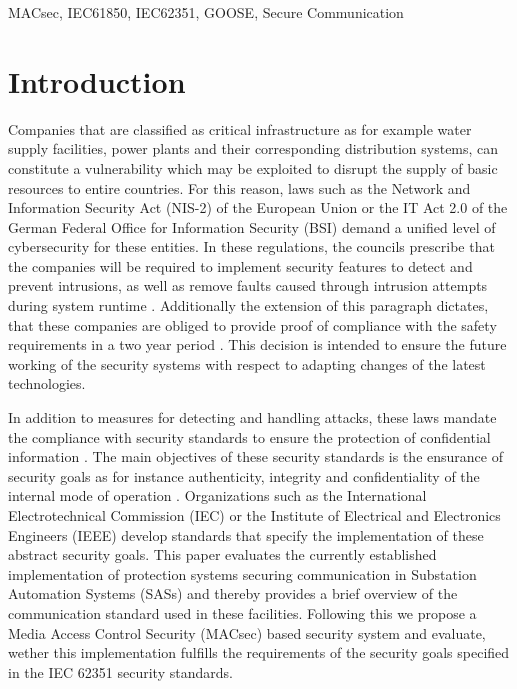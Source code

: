 \documentclass[conference, onecolumn, a4paper]{IEEEtran}
\begin{document}
\vspace{6 pt}

\begin{IEEEkeywords}
    MACsec, IEC61850, IEC62351, GOOSE, Secure Communication
\end{IEEEkeywords}

\section{Introduction}
\label{chapter:introduction}
\noindent Companies that are classified as critical infrastructure as for example water supply facilities, power plants and their corresponding 
distribution systems, can constitute a vulnerability which may be exploited to disrupt the supply of basic resources to entire countries. For this reason, 
laws such as the Network and Information Security Act (NIS-2) \cite{NIS-2:2022} of the European Union or the IT Act 2.0 \cite{IT-Gesetz_2:2021} of the 
German Federal Office for Information Security (BSI) demand a unified level of cybersecurity for these entities. In these regulations, the councils 
prescribe that the companies will be required to implement security features to detect and prevent intrusions, as well as remove faults caused through 
intrusion attempts during system runtime \cite[§11 (1d)]{IT-Gesetz_2:2021}. Additionally the extension of this paragraph dictates, that these companies 
are obliged to provide proof of compliance with the safety requirements in a two year period \cite[§11 (1e)]{IT-Gesetz_2:2021}. This decision is intended 
to ensure the future working of the security systems with respect to adapting changes of the latest technologies. 

\smallskip
In addition to measures for detecting and handling attacks, these laws mandate the compliance with security standards to ensure the protection of 
confidential information \cite[§2 (2a)]{IT-Gesetz_2:2021}. The main objectives of these security standards is the ensurance of security goals as for instance 
authenticity, integrity and confidentiality of the internal mode of operation \cite[§2 (13)]{IT-Gesetz_2:2021}. Organizations such as the International 
Electrotechnical Commission (IEC) or the Institute of Electrical and Electronics Engineers (IEEE) develop standards that specify the implementation of these 
abstract security goals. This paper evaluates the currently established implementation of protection systems securing communication in Substation Automation 
Systems (SASs) and thereby provides a brief overview of the communication standard used in these facilities. Following this we propose a Media Access Control 
Security (MACsec) based security system and evaluate, wether this implementation fulfills the requirements of the security goals specified in the IEC 62351 
security standards. 
\end{document}
